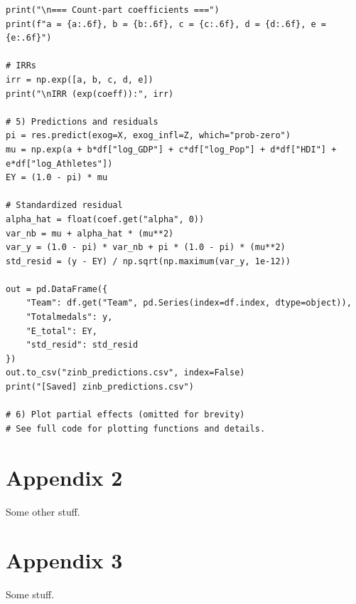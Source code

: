 \documentclass[11pt,twoside]{article}
\numberwithin{Theorem}{section}
\numberwithin{Definition}{section}
\numberwithin{Lemma}{section}
\numberwithin{Algorithm}{section}
\numberwithin{equation}{section}
\begin{document}
\begin{lstlisting}[caption={ZINB estimation on dataset1.xlsx using Python (statsmodels)}]
print("\n=== Count-part coefficients ===")
print(f"a = {a:.6f}, b = {b:.6f}, c = {c:.6f}, d = {d:.6f}, e = {e:.6f}")

# IRRs
irr = np.exp([a, b, c, d, e])
print("\nIRR (exp(coeff)):", irr)

# 5) Predictions and residuals
pi = res.predict(exog=X, exog_infl=Z, which="prob-zero")
mu = np.exp(a + b*df["log_GDP"] + c*df["log_Pop"] + d*df["HDI"] + e*df["log_Athletes"])
EY = (1.0 - pi) * mu

# Standardized residual
alpha_hat = float(coef.get("alpha", 0))
var_nb = mu + alpha_hat * (mu**2)
var_y = (1.0 - pi) * var_nb + pi * (1.0 - pi) * (mu**2)
std_resid = (y - EY) / np.sqrt(np.maximum(var_y, 1e-12))

out = pd.DataFrame({
    "Team": df.get("Team", pd.Series(index=df.index, dtype=object)),
    "Totalmedals": y,
    "E_total": EY,
    "std_resid": std_resid           
})
out.to_csv("zinb_predictions.csv", index=False)
print("[Saved] zinb_predictions.csv")

# 6) Plot partial effects (omitted for brevity)
# See full code for plotting functions and details.
\end{lstlisting}

\clearpage

\section{Appendix 2}
\label{app:two}

Some other stuff.
\clearpage

\section{Appendix 3}
\label{app:one}

Some stuff.
\clearpage
\end{document}
